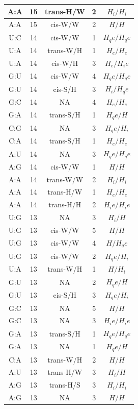 \begin{center}
\begin{longtable}{c|c|c|c|c}
A:A & 15 & trans-H/W & 2 & $H_i/H_i$ \\  \hline
A:A & 15 & cis-W/W & 2 & $H/H$ \\  \hline
U:C & 14 & cis-W/W & 1 & $H_qe/H_qe$ \\  \hline
U:A & 14 & trans-W/H & 1 & $H_e/H_e$ \\  \hline
U:A & 14 & cis-W/H & 3 & $H_e/H_ie$ \\  \hline
G:U & 14 & cis-W/W & 4 & $H_qe/H_qe$ \\  \hline
G:U & 14 & cis-S/H & 3 & $H_i/H_qe$ \\  \hline
G:C & 14 & NA & 4 & $H_e/H_e$ \\  \hline
G:A & 14 & trans-S/H & 1 & $H_qe/H$ \\  \hline
C:G & 14 & NA & 3 & $H_qe/H_i$ \\  \hline
C:A & 14 & trans-S/H & 1 & $H_e/H_e$ \\  \hline
A:U & 14 & NA & 3 & $H_qe/H_qe$ \\  \hline
A:G & 14 & cis-W/W & 1 & $H/H$ \\  \hline
A:A & 14 & trans-W/W & 2 & $H_i/H_i$ \\  \hline
A:A & 14 & trans-H/W & 1 & $H_e/H_e$ \\  \hline
A:A & 14 & trans-H/H & 2 & $H_ie/H_ie$ \\  \hline
U:G & 13 & NA & 3 & $H_i/H$ \\  \hline
U:G & 13 & cis-W/W & 5 & $H/H$ \\  \hline
U:G & 13 & cis-W/W & 4 & $H/H_qe$ \\  \hline
U:G & 13 & cis-W/W & 2 & $H_qe/H_i$ \\  \hline
U:A & 13 & trans-W/H & 1 & $H/H_i$ \\  \hline
G:U & 13 & NA & 2 & $H_qe/H$ \\  \hline
G:U & 13 & cis-S/H & 3 & $H_qe/H_i$ \\  \hline
G:C & 13 & NA & 5 & $H/H$ \\  \hline
G:C & 13 & NA & 3 & $H_ie/H_ie$ \\  \hline
G:A & 13 & trans-S/H & 1 & $H_qe/H_qe$ \\  \hline
G:A & 13 & NA & 1 & $H_qe/H$ \\  \hline
C:A & 13 & trans-W/H & 2 & $H/H$ \\  \hline
A:U & 13 & trans-H/W & 3 & $H_i/H$ \\  \hline
A:G & 13 & trans-H/S & 3 & $H_i/H_i$ \\  \hline
A:G & 13 & NA & 3 & $H/H$ \\  \hline

\end{longtable}
\end{center}
